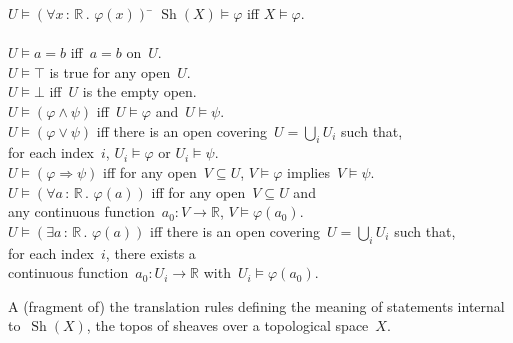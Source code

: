 \documentclass[oneside,reqno]{amsart}
\theoremstyle{definition}
\theoremstyle{plain}
\theoremstyle{remark}
\newcommand{\RR}{\mathbb{R}}
\DeclareMathOperator{\Sh}{Sh}
\renewcommand{\_}{\mathpunct{.}\,}
\newcommand{\?}{\,{:}\,}
\begin{document}
\begin{table}
  \begin{framed}\begin{tabbing}
    $U \models (\forall x\?\RR\_ \varphi(x))$ \= \kill
    $\Sh(X) \models \varphi$ \> iff $X \models \varphi$. \\\\
    $U \models a = b$ \> iff~$a = b$ on~$U$. \\
    $U \models \top$ \> is true for any open~$U$. \\
    $U \models \bot$ \> iff~$U$ is the empty open. \\
    $U \models (\varphi \wedge \psi)$ \> iff~$U \models \varphi$ and~$U \models \psi$. \\
    $U \models (\varphi \vee \psi)$ \> iff there is an open covering~$U =
    \bigcup_i U_i$ such that, \\ \> \qquad for each index~$i$, $U_i \models \varphi$
    or $U_i \models \psi$. \\
    $U \models (\varphi \Rightarrow \psi)$ \> iff for any open~$V \subseteq U$,
    $V \models \varphi$ implies~$V \models \psi$. \\
    $U \models (\forall a\?\RR\_ \varphi(a))$ \> iff for any open~$V
    \subseteq U$ and \\\>\qquad any continuous function~$a_0 : V \to \RR$, $V \models
    \varphi(a_0)$. \\
    $U \models (\exists a\?\RR\_ \varphi(a))$ \> iff there is an open
    covering~$U = \bigcup_i U_i$ such that, \\ \> \qquad for each index~$i$,
    there exists a \\\>\qquad continuous function~$a_0 : U_i \to \RR$ with~$U_i \models
    \varphi(a_0)$.
  \end{tabbing}\end{framed}
  \bigskip

  \caption{\label{table:sheaf} A (fragment of) the translation rules defining
  the meaning of statements internal to~$\Sh(X)$, the topos of sheaves over a
  topological space~$X$.}
\end{table}
\end{document}
